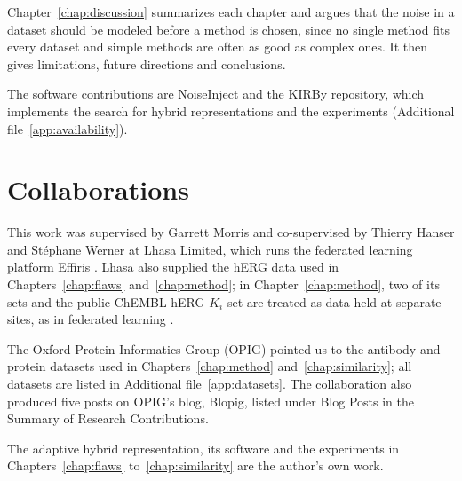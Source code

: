 Chapter~\ref{chap:discussion} summarizes each chapter and argues that the noise in a dataset should be modeled before a method is chosen, since no single method fits every dataset and simple methods are often as good as complex ones. It then gives limitations, future directions and conclusions. %

The software contributions are NoiseInject and the KIRBy repository, which implements the search for hybrid representations and the experiments (Additional file~\ref{app:availability}).


\section{Collaborations}


This work was supervised by Garrett Morris and co-supervised by Thierry Hanser and St\'ephane Werner at Lhasa Limited, which runs the federated learning platform Effiris \citep{Bassani2023}. Lhasa also supplied the hERG data used in Chapters~\ref{chap:flaws} and~\ref{chap:method}; in Chapter~\ref{chap:method}, two of its sets and the public ChEMBL hERG $K_i$ set are treated as data held at separate sites, as in federated learning \citep{Bassani2023, Hanser2023}.

The Oxford Protein Informatics Group (OPIG) pointed us to the antibody and protein datasets used in Chapters~\ref{chap:method} and~\ref{chap:similarity}; all datasets are listed in Additional file~\ref{app:datasets}. The collaboration also produced five posts on OPIG's blog, Blopig, listed under Blog Posts in the Summary of Research Contributions.

The adaptive hybrid representation, its software and the experiments in Chapters~\ref{chap:flaws} to~\ref{chap:similarity} are the author's own work.



\pagebreak
